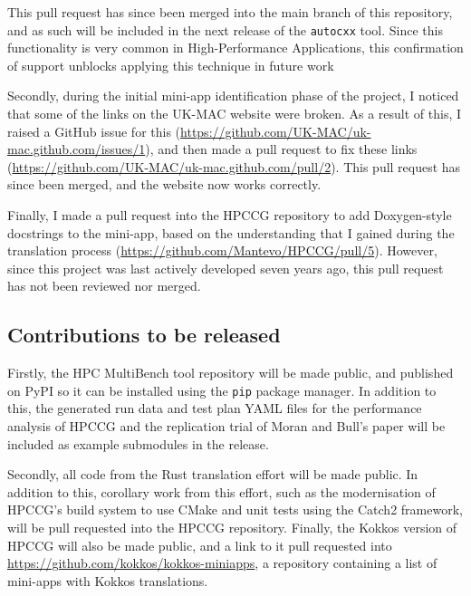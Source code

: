 This pull request has since been merged into the main branch of this repository, and as such will be included in the next release of the \texttt{autocxx} tool. Since this functionality is very common in High-Performance Applications, this confirmation of support unblocks applying this technique in future work

Secondly, during the initial \acrshort{mini-app} identification phase of the project, I noticed that some of the links on the UK-MAC website were broken. As a result of this, I raised a GitHub issue for this (\url{https://github.com/UK-MAC/uk-mac.github.com/issues/1}), and then made a pull request to fix these links (\url{https://github.com/UK-MAC/uk-mac.github.com/pull/2}). This pull request has since been merged, and the website now works correctly.

Finally, I made a pull request into the \acrshort{HPCCG} repository to add Doxygen-style docstrings to the \acrshort{mini-app}, based on the understanding that I gained during the translation process (\url{https://github.com/Mantevo/HPCCG/pull/5}). However, since this project was last actively developed seven years ago, this pull request has not been reviewed nor merged.

\subsection{Contributions to be released}
\label{ssec:open-source-to-be-released}

Firstly, the HPC MultiBench tool repository will be made public, and published on PyPI so it can be installed using the \texttt{pip} package manager. In addition to this, the generated run data and test plan YAML files for the performance analysis of \acrshort{HPCCG} and the replication trial of Moran and Bull's paper \cite{moranEmergingTechnologiesRust2023} will be included as example submodules in the release.

Secondly, all code from the Rust translation effort will be made public. In addition to this, corollary work from this effort, such as the modernisation of \acrshort{HPCCG}'s build system to use CMake and unit tests using the Catch2 framework, will be pull requested into the \acrshort{HPCCG} repository. Finally, the Kokkos version of \acrshort{HPCCG} will also be made public, and a link to it pull requested into \url{https://github.com/kokkos/kokkos-miniapps}, a repository containing a list of \acrshort{mini-app}s with Kokkos translations.

